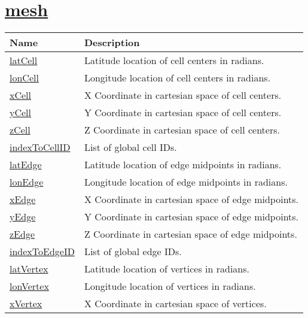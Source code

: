 \section[mesh]{\hyperref[sec:var_sec_mesh]{mesh}}
\label{sec:var_tab_mesh}

{\small
\begin{center}
\begin{longtable}{| p{2.0in} | p{4.0in} |}
	\hline
	{\bf Name} & {\bf Description} \\
	\hline
	\hyperref[subsec:var_sec_mesh_latCell]{latCell} & Latitude location of cell centers in radians. \\
	\hline
	\hyperref[subsec:var_sec_mesh_lonCell]{lonCell} & Longitude location of cell centers in radians. \\
	\hline
	\hyperref[subsec:var_sec_mesh_xCell]{xCell} & X Coordinate in cartesian space of cell centers. \\
	\hline
	\hyperref[subsec:var_sec_mesh_yCell]{yCell} & Y Coordinate in cartesian space of cell centers. \\
	\hline
	\hyperref[subsec:var_sec_mesh_zCell]{zCell} & Z Coordinate in cartesian space of cell centers. \\
	\hline
	\hyperref[subsec:var_sec_mesh_indexToCellID]{indexToCellID} & List of global cell IDs. \\
	\hline
	\hyperref[subsec:var_sec_mesh_latEdge]{latEdge} & Latitude location of edge midpoints in radians. \\
	\hline
	\hyperref[subsec:var_sec_mesh_lonEdge]{lonEdge} & Longitude location of edge midpoints in radians. \\
	\hline
	\hyperref[subsec:var_sec_mesh_xEdge]{xEdge} & X Coordinate in cartesian space of edge midpoints. \\
	\hline
	\hyperref[subsec:var_sec_mesh_yEdge]{yEdge} & Y Coordinate in cartesian space of edge midpoints. \\
	\hline
	\hyperref[subsec:var_sec_mesh_zEdge]{zEdge} & Z Coordinate in cartesian space of edge midpoints. \\
	\hline
	\hyperref[subsec:var_sec_mesh_indexToEdgeID]{indexToEdgeID} & List of global edge IDs. \\
	\hline
	\hyperref[subsec:var_sec_mesh_latVertex]{latVertex} & Latitude location of vertices in radians. \\
	\hline
	\hyperref[subsec:var_sec_mesh_lonVertex]{lonVertex} & Longitude location of vertices in radians. \\
	\hline
	\hyperref[subsec:var_sec_mesh_xVertex]{xVertex} & X Coordinate in cartesian space of vertices. \\

\end{longtable}
\end{center}}
